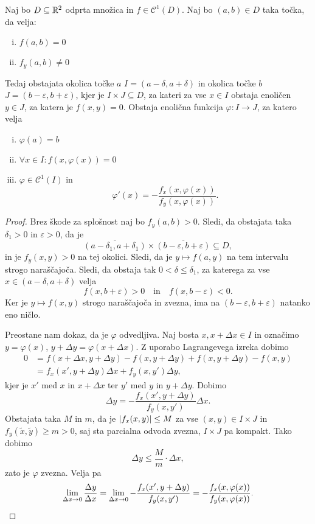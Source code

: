 \begin{izrek}
Naj bo $D \subseteq \mathbb{R}^2$ odprta množica in
$f \in \mathcal{C}^1(D)$. Naj bo $(a,b) \in D$ taka točka, da
velja:

\begin{enumerate}[i)]
\item $f(a,b) = 0$
\item $f_y(a,b) \ne 0$
\end{enumerate}

Tedaj obstajata okolica točke $a$ $I=(a-\delta, a+\delta)$ in
okolica točke $b$ $J=(b-\varepsilon, b+\varepsilon)$, kjer je
$I \times J \subseteq D$, za kateri za vse $x \in I$ obstaja
enoličen $y\in J$, za katera je $f(x,y) = 0$. Obstaja enolična
funkcija $\varphi \colon I \to J$, za katero velja

\begin{enumerate}[i)]
\item $\varphi(a) = b$
\item $\forall x \in I \colon f(x,\varphi(x)) = 0$
\item $\varphi \in \mathcal{C}^1(I)$ in
\[
\varphi'(x) = - \frac{f_x(x,\varphi(x))}{f_y(x,\varphi(x))}.
\]
\end{enumerate}
\end{izrek}

\begin{proof}
Brez škode za splošnost naj bo $f_y(a,b) > 0$. Sledi, da obstajata
taka $\delta_1 > 0$ in $\varepsilon > 0$, da je
\[
\overline{(a-\delta_1,a+\delta_1)} \times
\overline{(b-\varepsilon,b+\varepsilon)} \subseteq D,
\]
in je $f_y(x,y) > 0$ na tej okolici. Sledi, da je
$y \mapsto f(a,y)$ na tem intervalu strogo naraščajoča. Sledi, da
obstaja tak $0 < \delta \leq \delta_1$, za katerega za vse
$x \in (a-\delta, a+\delta)$ velja
\[
f(x, b+\varepsilon) > 0
\quad \text{in} \quad
f(x, b-\varepsilon) < 0.
\]
Ker je $y \mapsto f(x,y)$ strogo naraščajoča in zvezna, ima na
$(b-\varepsilon,b+\varepsilon)$ natanko eno ničlo.

Preostane nam dokaz, da je $\varphi$ odvedljiva. Naj bosta
$x, x+\Delta x \in I$ in označimo
$y = \varphi(x)$, $y + \Delta y = \varphi(x + \Delta x)$. Z uporabo
Lagrangevega izreka dobimo
\begin{align*}
0 &=
f(x + \Delta x, y + \Delta y) - f(x, y + \Delta y) +
f(x, y + \Delta y) - f(x, y)
\\
&= f_x(x', y + \Delta y) \Delta x + f_y(x, y') \Delta y,
\end{align*}
kjer je $x'$ med $x$ in $x + \Delta x$ ter $y'$ med $y$ in
$y + \Delta y$. Dobimo
\[
\Delta y = - \frac{f_x(x', y + \Delta y)}{f_y(x, y')} \Delta x.
\]
Obstajata taka $M$ in $m$, da je $\left\lvert f_x(x,y)\right\rvert \leq M$ za vse
$(x,y) \in I \times J$ in
$f_y(\widetilde{x},\widetilde{y}) \geq m > 0$, saj sta parcialna
odvoda zvezna, $I \times J$ pa kompakt. Tako dobimo
\[
\Delta y \leq \frac{M}{m} \cdot \Delta x,
\]
zato je $\varphi$ zvezna. Velja pa
\[
\lim_{\Delta x \to 0}\frac{\Delta y}{\Delta x} =
\lim_{\Delta x \to 0} - \frac{f_x(x', y + \Delta y)}{f_y(x, y')} =
- \frac{f_x(x,\varphi(x))}{f_y(x,\varphi(x))}. \qedhere
\]
\end{proof}

